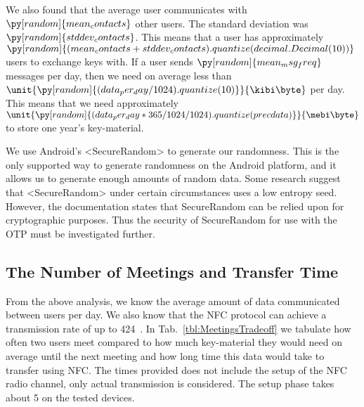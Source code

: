 We also found that the average user communicates with
\(\py[random]{mean_contacts}\)
other users.
The standard deviation was
\(\py[random]{stddev_contacts}\).
This means that a user has approximately
\(\py[random]{(mean_contacts 
+ stddev_contacts).quantize(decimal.Decimal(10))}\)
users to exchange keys with.
\reversemarginpar
{}
\reversemarginpar
If a user sends
\(\py[random]{mean_msg_freq}\)
messages per day, then we need on average less than
\(\unit{\py[random]{(data_per_day/1024).quantize( 10 )}}{\kibi\byte}\)
per day.
This means that we need approximately
\(\unit{\py[random]{(data_per_day*365/1024/1024).quantize( precdata 
)}}{\mebi\byte}\) to store one year's key-material.


We use Android's <SecureRandom> to generate our randomness.
This is the only supported way to generate randomness on the Android platform, 
and it allows us to generate enough amounts of random data.
Some research \cite{AndroidLowEntropyMyth,JavaRandomness} suggest that 
<SecureRandom> under certain circumstances uses a low entropy seed.
However, the documentation states that SecureRandom can be relied upon for 
cryptographic purposes.
Thus the security of SecureRandom for use with the \ac{OTP} must be 
investigated further.

\subsection{The Number of Meetings and Transfer Time}
\label{sec:Meetings}
From the above analysis, we know the average amount of data communicated 
between users per day.
We also know that the \ac{NFC} protocol can achieve a transmission rate of up 
to \unit{424}{\kilo\bit\per\second}~\cite{NFCController}.
In Tab.~\ref{tbl:MeetingsTradeoff} we tabulate how often two users meet 
compared to how much key-material they would need on average until the next 
meeting and how long time this data would take to transfer using \ac{NFC}.
The times provided does not include the setup of the \ac{NFC} radio channel, 
only actual transmission is considered. The setup phase takes about 
\unit{5}{\second} on the tested devices.

